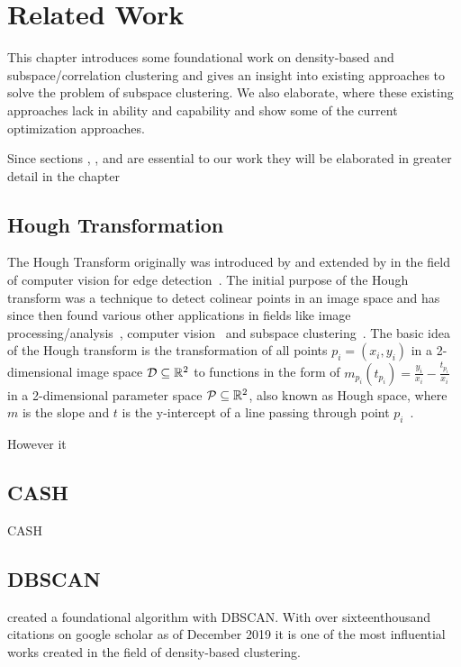 \chapter{Related Work}
\label{sec:Related Work}
This chapter introduces some foundational work on density-based and subspace/correlation clustering and gives an insight into existing approaches to solve the problem of subspace clustering. We also elaborate, where these existing approaches lack in ability and capability and show some of the current optimization approaches.

Since sections , ,  and  are essential to our work they will be elaborated in greater detail in the chapter 

\section{Hough Transformation}\label{sec:houghintro}
The Hough Transform originally was introduced by \textcite{houghOriginal1962method} and extended by \textcite{rosenfeld1969picture} in the field of computer vision for edge detection~\cite{houghhistoryhart2009hough}. The initial purpose of the Hough transform was a technique to detect colinear points in an image space and has since then found various other applications in fields like image processing/analysis~\cite{rosenfeld1969picture,ballard1981generalizing}, computer vision~\cite{davies2004machine} and subspace clustering~\cite{CASHachtert2008robust}.
The basic idea of the Hough transform is the transformation of all points $p_i = (x_i,y_i)$ in a 2-dimensional image space $\mathcal{D} \subseteq \mathbb{R}^2$ to functions in the form of ${m_{p_i}(t_{p_i}) = \frac{y_i}{x_i} - \frac{t_{p_i}}{x_i}}$ in a  2-dimensional parameter space $\mathcal{P} \subseteq \mathbb{R}^2$, also known as Hough space, where $m$ is the slope and $t$ is the y-intercept of a line passing through point $p_i$~\cite{illingworth1988survey}.

However it

\section{CASH}\label{sec:cashintro}
\ac{CASH}
\cite{CASHachtert2008robust}

\section{DBSCAN}\label{sec:dbscanintro}
\citeauthor{DBSCANEKSX96} created a foundational algorithm with \ac{DBSCAN}. With over sixteenthousand citations on google scholar as of December 2019 it is one of the most influential works created in the field of density-based clustering. 

